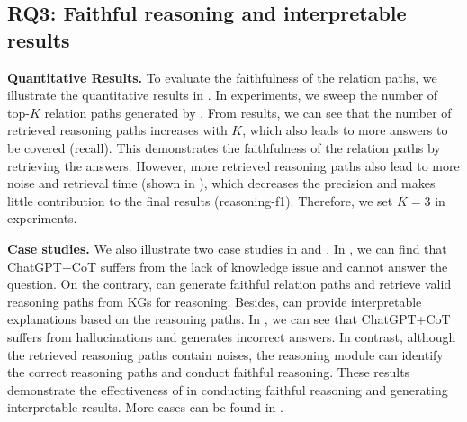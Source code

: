 % 


\subsection{RQ3: Faithful reasoning and interpretable results}\label{sec:cases}
\noindent\textbf{Quantitative Results.} To evaluate the faithfulness of the relation paths, we illustrate the quantitative results in . In experiments, we sweep the number of top-$K$ relation paths generated by \ourmethod. From results, we can see that the number of retrieved reasoning paths increases with $K$, which also leads to more answers to be covered (recall). This demonstrates the faithfulness of the relation paths by retrieving the answers. However, more retrieved reasoning paths also lead to more noise and retrieval time (shown in ), which decreases the precision and makes little contribution to the final results (reasoning-f1). Therefore, we set $K=3$ in experiments.




\noindent\textbf{Case studies.} We also illustrate two case studies in  and . In , we can find that ChatGPT+CoT suffers from the lack of knowledge issue and cannot answer the question. On the contrary, \ourmethod can generate faithful relation paths and retrieve valid reasoning paths from KGs for reasoning. Besides, \ourmethod can provide interpretable explanations based on the reasoning paths. In , we can see that ChatGPT+CoT suffers from hallucinations and generates incorrect answers. In contrast, although the retrieved reasoning paths contain noises, the reasoning module can identify the correct reasoning paths and conduct faithful reasoning. These results demonstrate the effectiveness of \ourmethod in conducting faithful reasoning and generating interpretable results. More cases can be found in .

